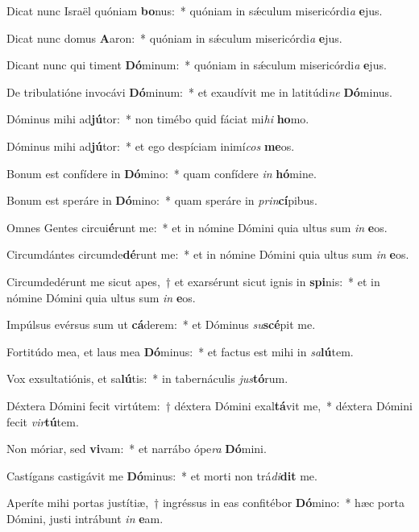 \item Dicat nunc Israël quóniam \textbf{bo}nus:~* quóniam in sǽculum misericórdi\textit{a} \textbf{e}jus.
\item Dicat nunc domus \textbf{A}aron:~* quóniam in sǽculum misericórdi\textit{a} \textbf{e}jus.
\item Dicant nunc qui timent \textbf{Dó}minum:~* quóniam in sǽculum misericórdi\textit{a} \textbf{e}jus.
\item De tribulatióne invocávi \textbf{Dó}minum:~* et exaudívit me in latitúdi\textit{ne} \textbf{Dó}minus.
\item Dóminus mihi ad\textbf{jú}tor:~* non timébo quid fáciat mi\textit{hi} \textbf{ho}mo.
\item Dóminus mihi ad\textbf{jú}tor:~* et ego despíciam inimí\textit{cos} \textbf{me}os.
\item Bonum est confídere in \textbf{Dó}mino:~* quam confídere \textit{in} \textbf{hó}mine.
\item Bonum est speráre in \textbf{Dó}mino:~* quam speráre in \textit{prin}\textbf{cí}pibus.
\item Omnes Gentes circui\textbf{é}runt me:~* et in nómine Dómini quia ultus sum \textit{in} \textbf{e}os.
\item Circumdántes circumde\textbf{dé}runt me:~* et in nómine Dómini quia ultus sum \textit{in} \textbf{e}os.
\item Circumdedérunt me sicut apes,~† et exarsérunt sicut ignis in \textbf{spi}nis:~* et in nómine Dómini quia ultus sum \textit{in} \textbf{e}os.
\item Impúlsus evérsus sum ut \textbf{cá}derem:~* et Dóminus \textit{su}\textbf{scé}pit me.
\item Fortitúdo mea, et laus mea \textbf{Dó}minus:~* et factus est mihi in \textit{sa}\textbf{lú}tem.
\item Vox exsultatiónis, et sa\textbf{lú}tis:~* in tabernáculis \textit{jus}\textbf{tó}rum.
\item Déxtera Dómini fecit virtútem:~† déxtera Dómini exal\textbf{tá}vit me,~* déxtera Dómini fecit \textit{vir}\textbf{tú}tem.
\item Non móriar, sed \textbf{vi}vam:~* et narrábo ópe\textit{ra} \textbf{Dó}mini.
\item Castígans castigávit me \textbf{Dó}minus:~* et morti non trá\textit{di}\textbf{dit} me.
\item Aperíte mihi portas justítiæ,~† ingréssus in eas confitébor \textbf{Dó}mino:~* hæc porta Dómini, justi intrábunt \textit{in} \textbf{e}am.
